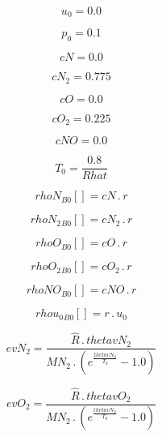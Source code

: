 \documentclass{article}
\begin{document}
\begin{dmath}u_{0} = 0.0\end{dmath}

\begin{dmath}p_{0} = 0.1\end{dmath}

\begin{dmath}cN = 0.0\end{dmath}

\begin{dmath}cN_{2} = 0.775\end{dmath}

\begin{dmath}cO = 0.0\end{dmath}

\begin{dmath}cO_{2} = 0.225\end{dmath}

\begin{dmath}cNO = 0.0\end{dmath}

\begin{dmath}T_{0} = \frac{0.8}{Rhat}\end{dmath}

\begin{dmath}{rhoN{_{B0}}}[{}] = cN \,.\, r\end{dmath}

\begin{dmath}{rhoN_{2}{_{B0}}}[{}] = cN_{2} \,.\, r\end{dmath}

\begin{dmath}{rhoO{_{B0}}}[{}] = cO \,.\, r\end{dmath}

\begin{dmath}{rhoO_{2}{_{B0}}}[{}] = cO_{2} \,.\, r\end{dmath}

\begin{dmath}{rhoNO{_{B0}}}[{}] = cNO \,.\, r\end{dmath}

\begin{dmath}{rhou_{0}{_{B0}}}[{}] = r \,.\, u_{0}\end{dmath}

\begin{dmath}evN_{2} = \frac{\hat{R} \,.\, thetavN_{2}}{MN_{2} \,.\, \left(e^{\frac{thetavN_{2}}{T_{0}}} - 1.0\right)}\end{dmath}

\begin{dmath}evO_{2} = \frac{\hat{R} \,.\, thetavO_{2}}{MN_{2} \,.\, \left(e^{\frac{thetavN_{2}}{T_{0}}} - 1.0\right)}\end{dmath}
\end{document}

